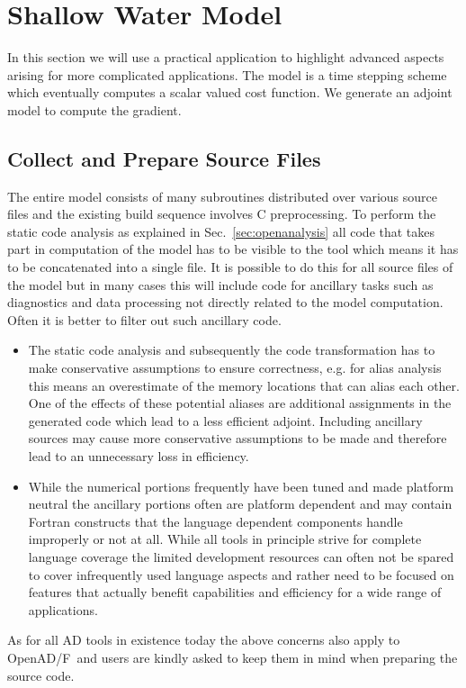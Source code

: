 \documentclass{book}
\newcommand{\OpenADF}{OpenAD/F}
\newcommand{\refsec}[1]{{Sec.~\ref{#1}}}
\begin{document}
\section{Shallow Water Model}
In this section we will use a practical application to highlight 
advanced aspects arising for more complicated applications. 
The model is a time stepping scheme which eventually computes 
a scalar valued cost function. We generate an adjoint model 
to compute the gradient.  

\subsection{Collect and Prepare Source Files} 
The entire model consists of many subroutines distributed over various 
source files and the existing build sequence involves C preprocessing.
To perform the static code analysis as explained in \refsec{sec:openanalysis}
all code that takes part in computation of the model has to be visible 
to the tool which means it has to be concatenated into a single file. 
It is possible to do this for all source files of the model but in many 
cases this will include code for ancillary tasks such as diagnostics 
and data processing not directly related to the model computation.
Often it is better to filter out such ancillary code. 
\begin{itemize}
\item The static code analysis and subsequently the code transformation
has to make conservative assumptions to ensure 
correctness, e.g. for alias analysis this means an overestimate of 
the memory locations that can alias each other. One of the effects of these potential aliases
are additional assignments in the generated code  which lead to 
a less efficient adjoint. Including ancillary sources may cause more conservative 
assumptions to be made and therefore lead to an unnecessary loss in efficiency.
\item While the numerical portions frequently have been tuned and made platform 
neutral the ancillary portions often are platform dependent and may contain
Fortran constructs that the language dependent components handle improperly or 
not at all. While all tools in principle strive for complete language coverage 
the limited development resources can often not be spared to cover 
infrequently used language aspects and rather need to be focused on features 
that actually benefit capabilities and efficiency for a wide range of applications.
\end{itemize}
As for all AD tools in existence today the above concerns also apply to 
\OpenADF\ and  users are kindly asked to keep them in mind when
preparing the source code.
\end{document}

